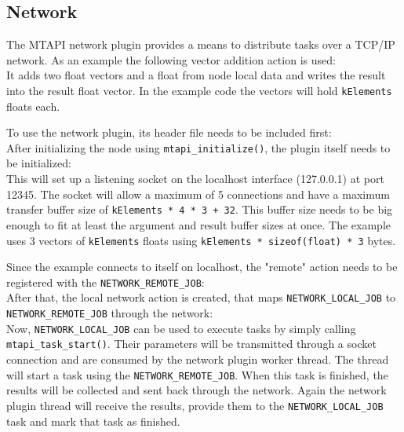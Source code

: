 \subsection{Network}

The MTAPI network plugin provides a means to distribute tasks over a TCP/IP network. As an example the following vector addition action is used:
%
\\
%
It adds two float vectors and a float from node local data and writes the result into the result float vector. In the example code the vectors will hold \lstinline|kElements| floats each.

To use the network plugin, its header file needs to be included first:
%
\\
%
After initializing the node using \lstinline|mtapi_initialize()|, the plugin itself needs to be initialized:
%
\\
%
This will set up a listening socket on the localhost interface (127.0.0.1) at port 12345. The socket will allow a maximum of 5 connections and have a maximum transfer buffer size of \lstinline|kElements * 4 * 3 + 32|. This buffer size needs to be big enough to fit at least the argument and result buffer sizes at once. The example uses 3 vectors of \lstinline|kElements| floats using \lstinline|kElements * sizeof(float) * 3| bytes.

Since the example connects to itself on localhost, the "remote" action needs to be registered with the \lstinline|NETWORK_REMOTE_JOB|:
%
\\
%
After that, the local network action is created, that maps \lstinline|NETWORK_LOCAL_JOB| to \lstinline|NETWORK_REMOTE_JOB| through the network:
%
\\
%
Now, \lstinline|NETWORK_LOCAL_JOB| can be used to execute tasks by simply calling \lstinline|mtapi_task_start()|. Their parameters will be transmitted through a socket connection and are consumed by the network plugin worker thread. The thread will start a task using the \lstinline|NETWORK_REMOTE_JOB|. When this task is finished, the results will be collected and sent back through the network. Again the network plugin thread will receive the results, provide them to the \lstinline|NETWORK_LOCAL_JOB| task and mark that task as finished.

